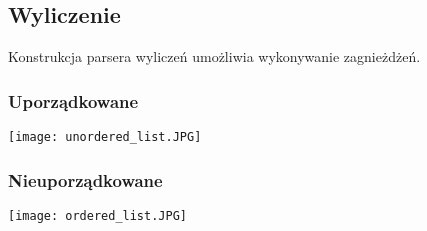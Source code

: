 \subsection{Wyliczenie}

Konstrukcja parsera wyliczeń umożliwia wykonywanie zagnieżdżeń.

\subsubsection{Uporządkowane}

\texttt{[image: unordered\_list.JPG]}

\subsubsection{Nieuporządkowane}

\texttt{[image: ordered\_list.JPG]}